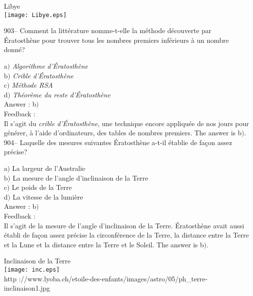 \documentclass[letterpaper, 12pt]{article}
\begin{document}
        \begin{center}
        Libye\\
    \texttt{[image: Libye.eps]}\\
    \end{center}

903-- Comment la litt\'erature nomme-t-elle la m\'ethode d\'ecouverte par
\'Eratosth\`ene pour trouver
tous les nombres premiers inf\'erieurs \`a un nombre donn\'e?

a$)$ {\sl Algorithme d'\'Eratosth\`ene} \\
b$)$ {\sl Crible d'\'Eratosth\`ene} \\
c$)$ {\sl M\'ethode RSA} \\
d$)$ {\sl Th\'eor\`eme du reste d'\'Eratosth\`ene}\\

Answer : b$)$\\

Feedback : \\
Il s'agit du {\sl crible d'\'Eratosth\`ene}, une technique encore
appliqu\'ee de nos jours
pour g\'en\'erer, \`a l'aide d'ordinateurs, des tables de nombres premiers.
The answer is b$)$.\\

904-- Laquelle des mesures suivantes \'Eratosth\`ene a-t-il
\'etablie de fa\c con assez pr\'ecise?

a$)$ La largeur de l'Australie \\
b$)$ La mesure de l'angle d'inclinaison de la Terre \\
c$)$ Le poids de la Terre \\
d$)$ La vitesse de la lumi\`ere\\

Answer : b$)$\\

Feedback :\\
Il s'agit de la mesure de l'angle d'inclinaison de la Terre.
\'Eratosth\`ene avait aussi \'etabli de fa\c con assez pr\'ecise la
circonf\'erence de la Terre, la distance entre la Terre et la Lune
et la distance entre la
Terre et le Soleil. The answer is b$)$.\\

        \begin{center}
        Inclinaison de la Terre\\
    \texttt{[image: inc.eps]}\\
        {\footnotesize http
://www.lyoba.ch/etoile-des-enfants/images/astro/05/ph\_terre-inclinaison1.jpg}
    \end{center}
\end{document}

